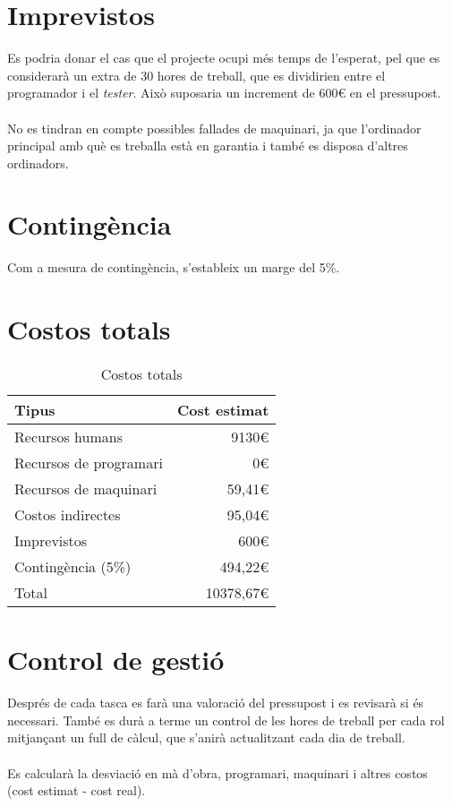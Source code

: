 \section{Imprevistos}
	Es podria donar el cas que el projecte ocupi més temps de l'esperat, pel que es considerarà un extra de 30 hores de treball, que es dividirien entre el programador i el \textit{tester}.
	Això suposaria un increment de 600€ en el pressupost. \\\\
	No es tindran en compte possibles fallades de maquinari, ja que l'ordinador principal amb què es treballa està en garantia i també es disposa d'altres ordinadors.

\section{Contingència}
	Com a mesura de contingència, s'estableix un marge del 5\%.

\section{Costos totals}
	\begin{table}[H]
		\begin{center}
			\begin{tabular}{p{8cm}  !{\vrule width -1pt}r}
				\textbf{Tipus} & \textbf{Cost estimat} \\ \hline
				Recursos humans & 9130€ \\
				Recursos de programari & 0€ \\
				Recursos de maquinari & 59,41€ \\
				Costos indirectes & 95,04€ \\
				Imprevistos & 600€ \\
				Contingència (5\%) & 494,22€ \\
				\noalign{\vskip 4mm}
				Total & 10378,67€
			\end{tabular}
		\end{center}
		\caption{Costos totals}
	\end{table}

\section{Control de gestió}
	Després de cada tasca es farà una valoració del pressupost i es revisarà si és necessari.
	També es durà a terme un control de les hores de treball per cada rol mitjançant un full de càlcul, que s'anirà actualitzant cada dia de treball.\\\\
	Es calcularà la desviació en mà d'obra, programari, maquinari i altres costos (cost estimat - cost real).
